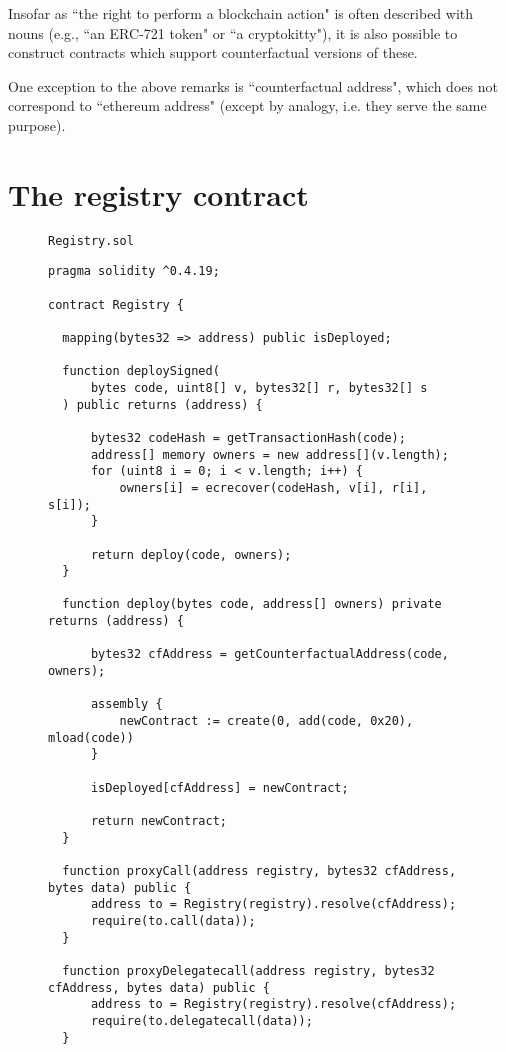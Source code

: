 \documentclass[prb,floatfix,reprint,nofootinbib,amsmath,amssymb,epsfig,pre,floats,letterpaper,groupedaffiliation,tightenlines,allcolors=blue,11pt]{revtex4}
\theoremstyle{definition}
\theoremstyle{definition}
\theoremstyle{definition}
\begin{document}
\begin{appendix}
Insofar as ``the right to perform a blockchain action" is often described with nouns (e.g., ``an ERC-721 token" or ``a cryptokitty"), it is also possible to construct contracts which support counterfactual versions of these.

One exception to the above remarks is ``counterfactual address", which does not correspond to ``ethereum address" (except by analogy, i.e. they serve the same purpose).

\newpage
\section{The registry contract}
\label{appendix:registry}

     \begin{figure}[H]
      \begin{soliditysnippet}{\texttt{Registry.sol}}
      \begin{lstlisting}[language=Solidity]
pragma solidity ^0.4.19;

contract Registry {

  mapping(bytes32 => address) public isDeployed;

  function deploySigned(
      bytes code, uint8[] v, bytes32[] r, bytes32[] s
  ) public returns (address) {

      bytes32 codeHash = getTransactionHash(code);
      address[] memory owners = new address[](v.length);
      for (uint8 i = 0; i < v.length; i++) {
          owners[i] = ecrecover(codeHash, v[i], r[i], s[i]);
      }

      return deploy(code, owners);
  }

  function deploy(bytes code, address[] owners) private returns (address) {

      bytes32 cfAddress = getCounterfactualAddress(code, owners);

      assembly {
          newContract := create(0, add(code, 0x20), mload(code))
      }

      isDeployed[cfAddress] = newContract;

      return newContract;
  }

  function proxyCall(address registry, bytes32 cfAddress, bytes data) public {
      address to = Registry(registry).resolve(cfAddress);
      require(to.call(data));
  }

  function proxyDelegatecall(address registry, bytes32 cfAddress, bytes data) public {
      address to = Registry(registry).resolve(cfAddress);
      require(to.delegatecall(data));
  }


\end{lstlisting}
\end{soliditysnippet}
\end{figure}
\end{appendix}
\end{document}
